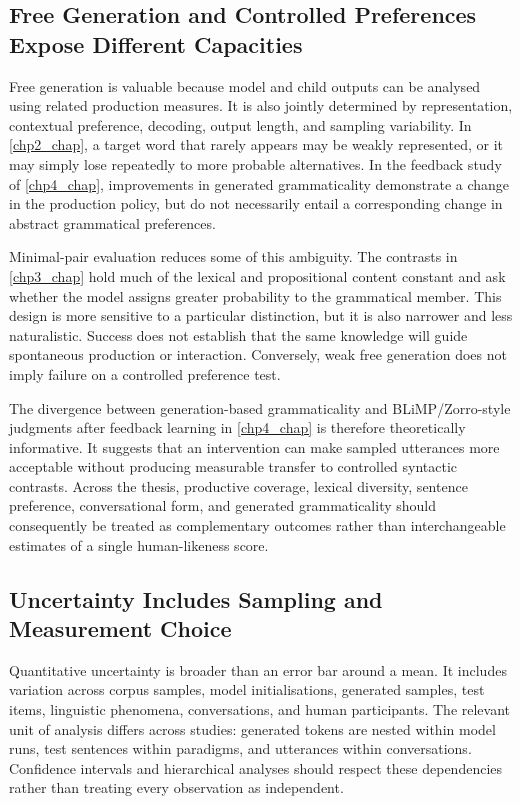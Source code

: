 \subsection{Free Generation and Controlled Preferences Expose Different Capacities}

Free generation is valuable because model and child outputs can be analysed using related production measures. It is also jointly determined by representation, contextual preference, decoding, output length, and sampling variability. In \cref{chp2_chap}, a target word that rarely appears may be weakly represented, or it may simply lose repeatedly to more probable alternatives. In the feedback study of \cref{chp4_chap}, improvements in generated grammaticality demonstrate a change in the production policy, but do not necessarily entail a corresponding change in abstract grammatical preferences.

Minimal-pair evaluation reduces some of this ambiguity. The contrasts in \cref{chp3_chap} hold much of the lexical and propositional content constant and ask whether the model assigns greater probability to the grammatical member. This design is more sensitive to a particular distinction, but it is also narrower and less naturalistic. Success does not establish that the same knowledge will guide spontaneous production or interaction. Conversely, weak free generation does not imply failure on a controlled preference test.

The divergence between generation-based grammaticality and BLiMP/Zorro-style judgments after feedback learning in \cref{chp4_chap} is therefore theoretically informative. It suggests that an intervention can make sampled utterances more acceptable without producing measurable transfer to controlled syntactic contrasts. Across the thesis, productive coverage, lexical diversity, sentence preference, conversational form, and generated grammaticality should consequently be treated as complementary outcomes rather than interchangeable estimates of a single human-likeness score.

\subsection{Uncertainty Includes Sampling and Measurement Choice}

Quantitative uncertainty is broader than an error bar around a mean. It includes variation across corpus samples, model initialisations, generated samples, test items, linguistic phenomena, conversations, and human participants. The relevant unit of analysis differs across studies: generated tokens are nested within model runs, test sentences within paradigms, and utterances within conversations. Confidence intervals and hierarchical analyses should respect these dependencies rather than treating every observation as independent.


